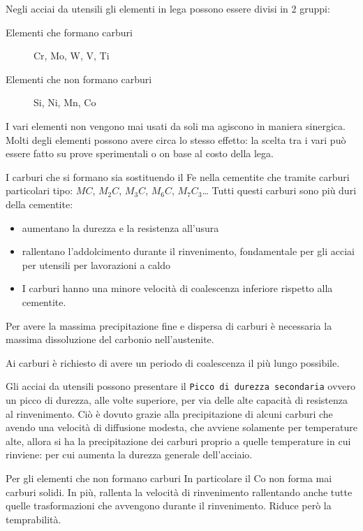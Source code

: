 Negli acciai da utensili gli elementi in lega possono essere divisi in 2 gruppi:
\begin{description}
\item[Elementi che formano carburi] Cr, Mo, W, V, Ti
\item[Elementi che non formano carburi] Si, Ni, Mn, Co
\end{description}
I vari elementi non vengono mai usati da soli ma agiscono in maniera sinergica.
Molti degli elementi possono avere circa lo stesso effetto: la scelta tra i vari può essere fatto su prove sperimentali o on base al costo della lega.

I carburi che si formano sia sostituendo il Fe nella cementite che tramite carburi particolari tipo: $MC$, $M_2C$, $M_3C$, $M_6C$, $M_7C_3$\dots
Tutti questi carburi sono più duri della cementite:
\begin{itemize}
\item aumentano la durezza e la resistenza all'usura
\item rallentano l'addolcimento durante il rinvenimento, fondamentale per gli acciai per utensili per lavorazioni a caldo 
\item I carburi hanno una minore velocità di coalescenza inferiore rispetto alla cementite.
\end{itemize}
Per avere la massima precipitazione fine e dispersa di carburi è necessaria la massima dissoluzione del carbonio nell'austenite.

Ai carburi è richiesto di avere un periodo di coalescenza il più lungo possibile.

Gli acciai da utensili possono presentare il \texttt{Picco di durezza secondaria} ovvero un picco di durezza, alle volte superiore, per via delle alte capacità di resistenza al rinvenimento. Ciò è dovuto grazie alla precipitazione di alcuni carburi che avendo una velocità di diffusione modesta, che avviene solamente per temperature alte, allora si ha la precipitazione dei carburi proprio a quelle temperature in cui rinviene: per cui aumenta la durezza generale dell'acciaio. 

Per gli elementi che non formano carburi
In particolare il Co non forma mai carburi solidi. In più, rallenta la velocità di rinvenimento rallentando anche tutte quelle trasformazioni che avvengono durante il rinvenimento. Riduce però la temprabilità.

